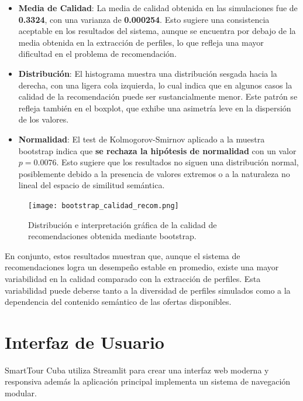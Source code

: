 \documentclass[runningheads]{llncs}
\begin{document}
\begin{itemize}
    \item \textbf{Media de Calidad}: La media de calidad obtenida en las simulaciones fue de \textbf{0.3324}, con una varianza de \textbf{0.000254}. Esto sugiere una consistencia aceptable en los resultados del sistema, aunque se encuentra por debajo de la media obtenida en la extracción de perfiles, lo que refleja una mayor dificultad en el problema de recomendación.
    
    \item \textbf{Distribución}: El histograma muestra una distribución sesgada hacia la derecha, con una ligera cola izquierda, lo cual indica que en algunos casos la calidad de la recomendación puede ser sustancialmente menor. Este patrón se refleja también en el boxplot, que exhibe una asimetría leve en la dispersión de los valores.
    
    \item \textbf{Normalidad}: El test de Kolmogorov-Smirnov aplicado a la muestra bootstrap indica que \textbf{se rechaza la hipótesis de normalidad} con un valor $p = 0.0076$. Esto sugiere que los resultados no siguen una distribución normal, posiblemente debido a la presencia de valores extremos o a la naturaleza no lineal del espacio de similitud semántica.
\end{itemize}

\begin{figure}[H]
    \centering
    \texttt{[image: bootstrap\_calidad\_recom.png]}
    \caption{Distribución e interpretación gráfica de la calidad de recomendaciones obtenida mediante bootstrap.}
    \label{fig:bootstrap-recomendaciones}
\end{figure}

En conjunto, estos resultados muestran que, aunque el sistema de recomendaciones logra un desempeño estable en promedio, existe una mayor variabilidad en la calidad comparado con la extracción de perfiles. Esta variabilidad puede deberse tanto a la diversidad de perfiles simulados como a la dependencia del contenido semántico de las ofertas disponibles.


\section{Interfaz de Usuario}


SmartTour Cuba utiliza Streamlit para crear una interfaz web moderna y responsiva además la aplicación principal implementa un sistema de navegación modular.
\end{document}

